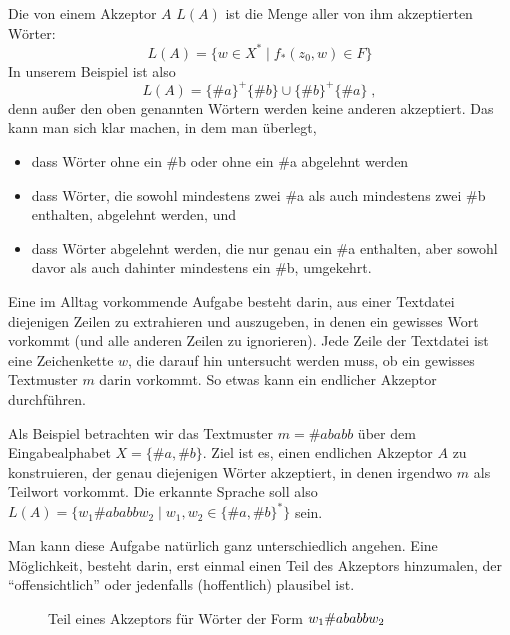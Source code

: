 Die von einem Akzeptor $A$  $L(A)$ ist die Menge aller von ihm
akzeptierten Wörter:
\[
L(A) = \{ w\in X^* \mid f_*(z_0,w)\in F\}
\]
In unserem Beispiel ist also 
\[
L(A) = \{\#a\}^+\{\#b\} \cup \{\#b\}^+\{\#a\} \;,
\]
denn außer den oben genannten Wörtern werden keine anderen akzeptiert.
Das kann man sich klar machen, in dem man überlegt,
\begin{itemize}
\item dass Wörter ohne ein \#b oder ohne ein \#a abgelehnt werden
\item dass Wörter, die sowohl mindestens zwei \#a als auch mindestens
  zwei \#b enthalten, abgelehnt werden, und
\item dass Wörter abgelehnt werden, die \zB nur genau ein \#a
  enthalten, aber sowohl davor als auch dahinter mindestens ein \#b,
  \bzw umgekehrt.
\end{itemize}
%
Eine im Alltag vorkommende Aufgabe besteht darin, aus einer Textdatei
diejenigen Zeilen zu extrahieren und \zB auszugeben, in denen ein
gewisses Wort vorkommt (und alle anderen Zeilen zu ignorieren). Jede
Zeile der Textdatei ist eine Zeichenkette $w$, die darauf hin
untersucht werden muss, ob ein gewisses Textmuster $m$ darin vorkommt.
So etwas kann ein endlicher Akzeptor durchführen.

Als Beispiel betrachten wir das Textmuster $m=\#{ababb}$ über dem
Eingabealphabet $X=\{\#a, \#b\}$. Ziel ist es, einen endlichen
Akzeptor $A$ zu konstruieren, der genau diejenigen Wörter akzeptiert,
in denen irgendwo $m$ als Teilwort vorkommt. Die erkannte Sprache soll
also $L(A) = \{ w_1\#{ababb}w_2 \mid w_1,w_2\in \{\#a, \#b\}^*\}$
sein.

Man kann diese Aufgabe natürlich ganz unterschiedlich angehen. Eine
Möglichkeit, besteht darin, erst einmal einen Teil des Akzeptors
hinzumalen, der "`offensichtlich"' oder jedenfalls (hoffentlich)
plausibel ist.

\begin{figure}[ht]
  \centering
  \caption{Teil eines Akzeptors für Wörter der Form $w_1\protect\#{ababb}w_2$}
  \label{fig:akzeptor-ababb-teil}
\end{figure}

